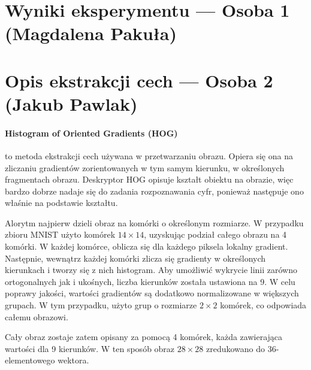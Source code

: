 \documentclass[10pt]{article}
\begin{document}
\pagebreak

\section{Wyniki eksperymentu --- Osoba 1 (Magdalena Pakuła)}
\pagebreak

\section{Opis ekstrakcji cech --- Osoba 2 (Jakub Pawlak)}

\paragraph{Histogram of Oriented Gradients (HOG)} to metoda ekstrakcji cech używana w przetwarzaniu obrazu.
Opiera się ona na zliczaniu gradientów zorientowanych w tym samym kierunku, w określonych fragmentach obrazu.
Deskryptor HOG opisuje kształt obiektu na obrazie, więc bardzo dobrze nadaje się do zadania rozpoznawania cyfr, ponieważ następuje ono właśnie na podstawie kształtu.

Alorytm najpierw dzieli obraz na komórki o określonym rozmiarze. W przypadku zbioru MNIST użyto komórek $14\times14$, uzyskując podział całego obrazu na 4 komórki.
W każdej komórce, oblicza się dla każdego piksela lokalny gradient.
Następnie, wewnątrz każdej komórki zlicza się gradienty w określonych kierunkach i tworzy się z nich histogram.
Aby umożliwić wykrycie linii zarówno ortogonalnych jak i ukośnych, liczba kierunków została ustawiona na 9.
W celu poprawy jakości, wartości gradientów są dodatkowo normalizowane w większych grupach.
W tym przypadku, użyto grup o rozmiarze $2\times2$ komórek, co odpowiada całemu obrazowi.

Cały obraz zostaje zatem opisany za pomocą 4 komórek, każda zawierająca wartości dla 9 kierunków.
W ten sposób obraz $28\times28$ zredukowano do 36-elementowego wektora.
\end{document}
